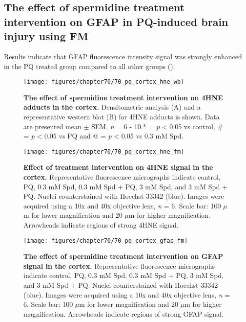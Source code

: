 \subsection{The effect of spermidine treatment intervention on GFAP in PQ-induced brain injury using FM}
Results indicate that GFAP fluorescence intensity signal was strongly enhanced in the PQ treated group compared to all other groups ().

\begin{landscape}
\begin{figure}[!htbp]
\center
  \texttt{[image: figures/chapter70/70\_pq\_cortex\_hne\_wb]}
  \caption[The effect of spermidine treatment intervention on 4HNE adducts in the cortex]{\textbf{The effect of spermidine treatment intervention on 4HNE adducts in the cortex.} Densitometric analysis (A) and a representative western blot (B) for 4HNE adducts is shown. Data are presented  mean $\pm$ SEM, \textit{n} = 6 - 10.* = \textit{p} < 0.05 vs control, \# = \textit{p} < 0.05 vs PQ and @ = \textit{p} < 0.05 vs 0.3 mM Spd.}
  \label{fig:70_pq_cortex_hne_wb}
\end{figure} 
\end{landscape}

\begin{landscape}
\begin{figure}[!htbp]
\center
  \texttt{[image: figures/chapter70/70\_pq\_cortex\_hne\_fm]}
  \caption[Effect of treatment intervention on 4HNE signal in the cortex]{\textbf{Effect of treatment intervention on 4HNE signal in the cortex.} Representative fluorescence micrographs indicate control, PQ, 0.3 mM Spd, 0.3 mM Spd + PQ, 3 mM Spd, and 3 mM Spd + PQ. Nuclei counterstained with Hoechst 33342 (blue). Images were acquired using a 10x and 40x objective lens, \textit{n} = 6. Scale bar: 100 $\mu$m for lower magnification and 20 $\mu$m for higher magnification. Arrowheads indicate regions of strong 4HNE signal.}
  \label{fig:70_pq_cortex_hne_fm}
\end{figure} 
\end{landscape}

\begin{landscape}
\begin{figure}[!htbp]
\center
  \texttt{[image: figures/chapter70/70\_pq\_cortex\_gfap\_fm]}
  \caption[The effect of spermidine treatment intervention on GFAP signal in the cortex]{\textbf{The effect of spermidine treatment intervention on GFAP signal in the cortex.} Representative fluorescence micrographs indicate control, PQ, 0.3 mM Spd, 0.3 mM Spd + PQ, 3 mM Spd, and 3 mM Spd + PQ. Nuclei counterstained with Hoechst 33342 (blue). Images were acquired using a 10x and 40x objective lens, \textit{n} = 6. Scale bar: 100 $\mu$m for lower magnification and 20 $\mu$m for higher magnification. Arrowheads indicate regions of strong GFAP signal.}
  \label{fig:70_pq_cortex_gfap_fm}
\end{figure} 
\end{landscape}


